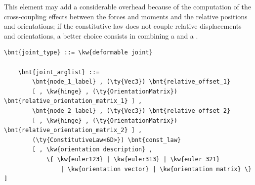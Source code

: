 \noindent
This element may add a considerable overhead because of the computation
of the cross-coupling effects between the forces and moments and the
relative positions and orientations; if the constitutive law does not couple
relative displacements and orientations, a better choice consists 
in combining a  and a .
\begin{Verbatim}[commandchars=\\\{\}]
    \bnt{joint_type} ::= \kw{deformable joint}

    \bnt{joint_arglist} ::= 
        \bnt{node_1_label} , (\ty{Vec3}) \bnt{relative_offset_1}
        [ , \kw{hinge} , (\ty{OrientationMatrix}) \bnt{relative_orientation_matrix_1} ] ,
        \bnt{node_2_label} , (\ty{Vec3}) \bnt{relative_offset_2}
        [ , \kw{hinge} , (\ty{OrientationMatrix}) \bnt{relative_orientation_matrix_2} ] ,
        (\ty{ConstitutiveLaw<6D>}) \bnt{const_law}
        [ , \kw{orientation description} ,
            \{ \kw{euler123} | \kw{euler313} | \kw{euler 321}
                | \kw{orientation vector} | \kw{orientation matrix} \} ]
\end{Verbatim}

